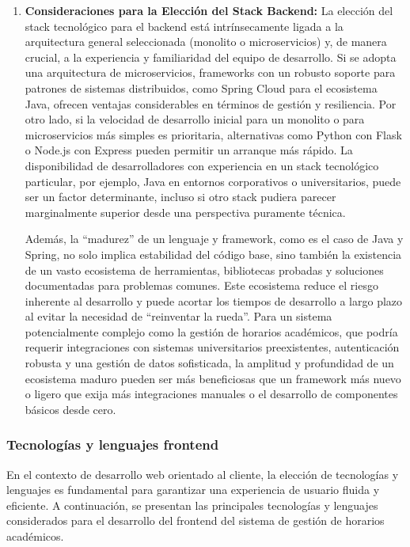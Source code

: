 \begin{enumerate}
    \item \textbf{Consideraciones para la Elección del Stack Backend:}
    La elección del stack tecnológico para el backend está intrínsecamente ligada a la arquitectura general seleccionada (monolito o microservicios) y, de manera crucial, a la experiencia y familiaridad del equipo de desarrollo. Si se adopta una arquitectura de microservicios, frameworks con un robusto soporte para patrones de sistemas distribuidos, como Spring Cloud para el ecosistema Java, ofrecen ventajas considerables en términos de gestión y resiliencia. Por otro lado, si la velocidad de desarrollo inicial para un monolito o para microservicios más simples es prioritaria, alternativas como Python con Flask o Node.js con Express pueden permitir un arranque más rápido. La disponibilidad de desarrolladores con experiencia en un stack tecnológico particular, por ejemplo, Java en entornos corporativos o universitarios, puede ser un factor determinante, incluso si otro stack pudiera parecer marginalmente superior desde una perspectiva puramente técnica.

    Además, la ``madurez'' de un lenguaje y framework, como es el caso de Java y Spring, no solo implica estabilidad del código base, sino también la existencia de un vasto ecosistema de herramientas, bibliotecas probadas y soluciones documentadas para problemas comunes. Este ecosistema reduce el riesgo inherente al desarrollo y puede acortar los tiempos de desarrollo a largo plazo al evitar la necesidad de ``reinventar la rueda''. Para un sistema potencialmente complejo como la gestión de horarios académicos, que podría requerir integraciones con sistemas universitarios preexistentes, autenticación robusta y una gestión de datos sofisticada, la amplitud y profundidad de un ecosistema maduro pueden ser más beneficiosas que un framework más nuevo o ligero que exija más integraciones manuales o el desarrollo de componentes básicos desde cero.
\end{enumerate}

\subsubsection{Tecnologías y lenguajes frontend}

En el contexto de desarrollo web orientado al cliente, la elección de tecnologías y lenguajes es fundamental para garantizar una experiencia de usuario fluida y eficiente. A continuación, se presentan las principales tecnologías y lenguajes considerados para el desarrollo del frontend del sistema de gestión de horarios académicos.

